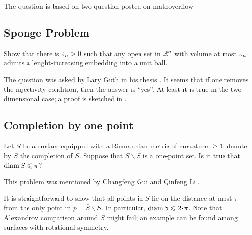 The question is based on two question posted on mathoverflow \cite{rourke-optic, petrunin-optic}

\subsection*{Sponge Problem}

\begin{pr}
Show that there is $\varepsilon_n>0$ such that any open set in $\mathbb{R}^n$ with volume at most $\varepsilon_n$ admits a lenght-increasing embedding into a unit ball.
\end{pr}

The question was asked by Lary Guth in his thesis \cite{guth-2005}.
It seems that if one removes the injectivity condition, then the answer is ``yes''.
At least it is true in the two-dimensional case; a proof is sketched in \cite{petrunin-guth}.

\subsection*{Completion by one point}

\begin{pr}
Let $S$ be a surface equipped with a Riemannian metric of curvature $\ge 1$;
denote by $\bar S$ the completion of $S$.
Suppose that $\bar S\backslash S$ is a one-point set.
Is it true that $\operatorname{\rm diam}\nolimits S\leqslant \pi$?
\end{pr}

This problem was mentioned by Changfeng Gui and Qinfeng Li
\cite[right after Theorem 1.3]{gui-li}.

It is straightforward to show that all points in $\bar S$ lie on the distance at most $\pi$ from the only point in $p=\bar S\backslash S$.
In particular, $\diam S\le 2\cdot\pi$.
Note that Alexandrov comparison around $\bar S$ might fail;
an example can be found among surfaces with rotational symmetry.

